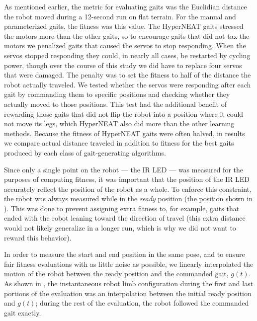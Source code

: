 As mentioned earlier, the metric for evaluating gaits was the Euclidian distance the robot
moved during a 12-second run on flat terrain. For the manual and parameterized gaits,
the fitness was this value. The HyperNEAT gaits stressed the motors
more than the other gaits, so to encourage gaits that did not tax the
motors we penalized gaits that caused the servos to stop
responding. When the servos stopped responding they could, in nearly
all cases, be restarted by cycling power, though over the course of
this study we did have to replace four servos that were damaged.
The penalty was to set the fitness to half of the distance
the robot actually traveled. We tested whether the servos were
responding after each gait by commanding them to specific positions
and checking whether they actually moved to those positions. This test
had the additional benefit of rewarding those gaits that did not flip
the robot into a position where it could not move its legs, which
HyperNEAT also did more than the other learning methods. Because the
fitness of HyperNEAT gaits were often halved, in results we compare
actual distance traveled in addition to fitness for the best gaits
produced by each class of gait-generating algorithms.

Since only a single point on the robot --- the IR LED --- was measured
for the purposes of computing fitness, it was important that the
position of the IR LED accurately reflect the position of the robot as
a whole.  To enforce this constraint, the robot was always measured
while in the \emph{ready} position (the position shown in
).  This was done to prevent assigning extra
fitness to, for example, gaits that ended with the robot leaning toward
the direction of travel (this extra distance would not likely generalize
in a longer run, which is why we did not want to reward this behavior).

In order to measure the start and end position in the same pose, and to ensure fair fitness evaluations with as little noise as possible, we
linearly interpolated the motion of the robot between the ready
position and the commanded gait, $g(t)$.  As shown in
, the instantaneous robot limb configuration
during the first and last portions of the evaluation was an
interpolation between the initial ready position and $g(t)$;
during the rest of the evaluation, the robot followed the commanded
gait exactly.

